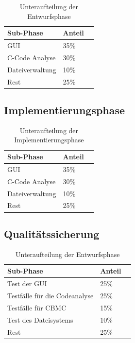 \documentclass[a4paper]{scrreprt}
\begin{document}
\begin{center}
\begin{table}[H]
\centering
  \begin{tabular}{|p{3cm}|P{2cm}|P{2cm}|}
    Sub-Phase & Anteil \\ \hline
    GUI & 35\%\\ \hline
    C-Code Analyse & 30\%\\ \hline
    Dateiverwaltung & 10\%\\ \hline
    Rest & 25\%\\
  \end{tabular}
  \newline\newline
  \caption{Unteraufteilung der Entwurfsphase}\label{entw}
\end{table}

\subsection{Implementierungsphase}

\begin{table}[H]
\centering
  \begin{tabular}{|p{3cm}|P{2cm}|P{2cm}|}
    Sub-Phase & Anteil \\ \hline
    GUI & 35\%\\ \hline
    C-Code Analyse & 30\% \\ \hline
    Dateiverwaltung & 10\% \\ \hline
    Rest & 25\%  \\
  \end{tabular}
  \newline\newline
  \caption{Unteraufteilung der Implementierungsphase}\label{impl}
\end{table} 

\subsection{Qualitätssicherung}
\begin{table}[H]
\centering
  \begin{tabular}{|p{3cm}|P{2cm}|P{2cm}|}
    Sub-Phase & Anteil \\ \hline
    Test der GUI & 25\% \\ \hline
    Testfälle  für die Codeanalyse & 25\% \\ \hline
    Testfälle für CBMC & 15\% \\ \hline
    Test des Dateisystems & 10\% \\ \hline
    Rest & 25\%  \\
  \end{tabular}
  \newline\newline
  \caption{Unteraufteilung der Entwurfsphase}\label{qs}
\end{table}
\end{center}
\end{document}
